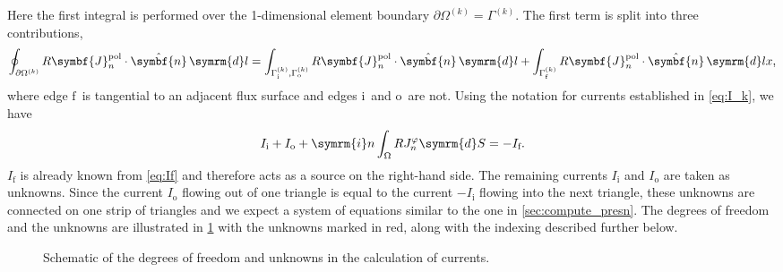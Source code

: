 \documentclass[a4paper, twoside, 10pt, english]{article}
\numberwithin{equation}{section}
\let\temp\varrho
\let\varrho\rho
\let\rho\temp
\let\temp\vartheta
\let\vartheta\theta
\let\theta\temp
\let\temp\varphi
\let\varphi\phi
\let\phi\temp
\let\vec\symbf
\newcommand*\diff{\ensuremath{\symrm{d}}}  %
\newcommand*\im{\ensuremath{\symrm{i}}}  %
\newcommand*\pol{\ensuremath{\textrm{pol}}}  %
\newcommand*\fs{\ensuremath{\textrm{f}}}  %
\newcommand*\inw{\ensuremath{\textrm{i}}}  %
\newcommand*\out{\ensuremath{\textrm{o}}}  %
\begin{document}
Here the first integral is performed over the 1-dimensional element boundary $\partial \Omega^{(k)} = \Gamma^{(k)}$. The first term is split into three contributions,
\begin{gather}
  \oint_{\partial \Omega^{(k)}} R \vec{J}_{n}^{\pol} \cdot \hat{\vec{n}} \, \diff l = \int_{\Gamma_{\inw}^{(k)}, \Gamma_{\out}^{(k)}} R \vec{J}_{n}^{\pol} \cdot \hat{\vec{n}} \, \diff l + \int_{\Gamma_{\fs}^{(k)}} R \vec{J}_{n}^{\pol} \cdot \hat{\vec{n}} \, \diff lx,
\end{gather}
where edge \fs\ is tangential to an adjacent flux surface and edges \inw\ and \out\ are not. Using the notation for currents established in \cref{eq:I_k}, we have
\begin{gather}
  I_{\inw} + I_{\out} + \im n \int_{\Omega} R J_{n}^{\phi} \diff S = -I_{\fs}.
\end{gather}
 $I_{\fs}$ is already known from \cref{eq:If} and therefore acts as a source on the right-hand side. The remaining currents $I_{\inw}$ and $I_{\out}$ are taken as unknowns. Since the current $I_{\out}$ flowing out of one triangle is equal to the current $-I_{\inw}$ flowing into the next triangle, these unknowns are connected on one strip of triangles and we expect a system of equations similar to the one in \cref{sec:compute_presn}. The degrees of freedom and the unknowns are illustrated in \cref{fig:current_perturbation} with the unknowns marked in red, along with the indexing described further below.
\begin{figure}[bth]
  \centering
  
  \caption{Schematic of the degrees of freedom and unknowns in the calculation of currents.}
  \label{fig:current_perturbation}
\end{figure}
\end{document}
